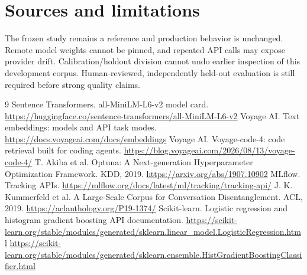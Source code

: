 \documentclass[11pt]{article}
\begin{document}
\section{Sources and limitations}
The frozen study remains a reference and production behavior is unchanged.
Remote model weights cannot be pinned, and repeated API calls may expose
provider drift. Calibration/holdout division cannot undo earlier inspection
of this development corpus. Human-reviewed, independently held-out evaluation
is still required before strong quality claims.


\begin{thebibliography}{9}
 Sentence Transformers. all-MiniLM-L6-v2 model card.
\url{https://huggingface.co/sentence-transformers/all-MiniLM-L6-v2}
 Voyage AI. Text embeddings: models and API task modes.
\url{https://docs.voyageai.com/docs/embeddings}
 Voyage AI. Voyage-code-4: code retrieval built for coding agents.
\url{https://blog.voyageai.com/2026/08/13/voyage-code-4/}
 T. Akiba et al. Optuna: A Next-generation Hyperparameter
Optimization Framework. KDD, 2019. \url{https://arxiv.org/abs/1907.10902}
 MLflow. Tracking APIs.
\url{https://mlflow.org/docs/latest/ml/tracking/tracking-api/}
 J. K. Kummerfeld et al. A Large-Scale Corpus for
Conversation Disentanglement. ACL, 2019. \url{https://aclanthology.org/P19-1374/}
 Scikit-learn. Logistic regression and histogram
gradient boosting API documentation.
\url{https://scikit-learn.org/stable/modules/generated/sklearn.linear_model.LogisticRegression.html}
\url{https://scikit-learn.org/stable/modules/generated/sklearn.ensemble.HistGradientBoostingClassifier.html}
\end{thebibliography}
\end{document}
